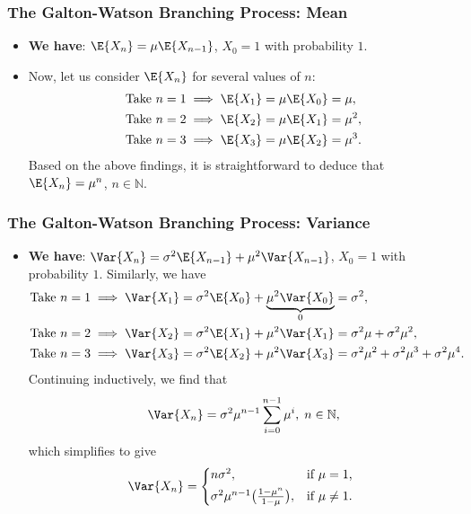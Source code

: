 \subsubsection{The Galton-Watson Branching Process: Mean}
\begin{itemize}
      \item \textbf{We have}: $ \E{X_{n}}=\mu \E{X_{n-1}} $, $ X_0=1 $ with probability $1$.
      \item Now, let us consider $ \E{X_n} $ for several values of $ n $:
            \begin{align*}
                   & \text{Take }n=1\implies \E{X_1}=\mu\E{X_0}=\mu,   \\
                   & \text{Take }n=2\implies \E{X_2}=\mu\E{X_1}=\mu^2, \\
                   & \text{Take }n=3\implies \E{X_3}=\mu\E{X_2}=\mu^3.
            \end{align*}
            Based on the above findings, it is straightforward to deduce that $ \E{X_n}=\mu^n $, $ n\in\mathbb{N} $.
\end{itemize}
\subsubsection{The Galton-Watson Branching Process: Variance}
\begin{itemize}
      \item \textbf{We have}: $ \Var{X_n}=\sigma^2\E{X_{n-1}}+\mu^2\Var{X_{n-1}} $, $ X_0=1 $ with probability $ 1 $.
            Similarly, we have
            \begin{align*}
                   & \text{Take }n=1\implies \Var{X_1}=\sigma^2\E{X_0}+\underbrace{\mu^2\Var{X_0}}_{0}=\sigma^2,                 \\
                   & \text{Take }n=2\implies \Var{X_2}=\sigma^2\E{X_1}+\mu^2\Var{X_1}=\sigma^2\mu+\sigma^2\mu^2,                 \\
                   & \text{Take }n=3\implies \Var{X_3}=\sigma^2\E{X_2}+\mu^2\Var{X_3}=\sigma^2\mu^2+\sigma^2\mu^3+\sigma^2\mu^4.
            \end{align*}
            Continuing inductively, we find that
            \[ \Var{X_n}=\sigma^2\mu^{n-1}\sum_{i=0}^{n-1} \mu^i,\; n\in\mathbb{N}, \]
            which simplifies to give
            \[ \Var{X_n}=\begin{cases*}
                        n\sigma^2,                                           & \text{if $ \mu=1 $},  \\
                        \sigma^2\mu^{n-1}\bigl(\frac{1-\mu^n}{1-\mu} \bigr), & \text{if $\mu\ne 1$}.
                  \end{cases*} \]
\end{itemize}
